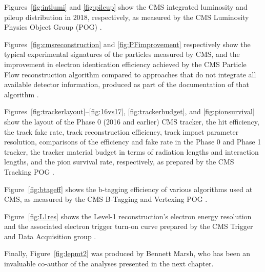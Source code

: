 Figures~\ref{fig:intlumi} and \ref{fig:pileup} show the CMS integrated luminosity and pileup distribution in 2018, respectively, as measured by the CMS Luminosity Physics Object Group (POG) \cite{lumipublic}.

Figures~\ref{fig:cmsreconstruction} and \ref{fig:PFimprovement} respectively show the typical experimental signatures of the particles measured by CMS, and the improvement in electron identication efficiency achieved by the CMS Particle Flow reconstruction algorithm compared to approaches that do not integrate all available detector information, produced as part of the documentation of that algorithm \cite{particleflow}.

Figures~\ref{fig:trackerlayout}--\ref{fig:16vs17}, \ref{fig:trackerbudget}, and \ref{fig:pionsurvival} show the layout of the Phase 0 (2016 and earlier) CMS tracker, the hit efficiency, the track fake rate, track reconstruction efficiency, track impact parameter resolution, comparisons of the efficiency and fake rate in the Phase 0 and Phase 1 tracker, the tracker material budget in terms of radiation lengths and interaction lengths, and the pion survival rate, respectively, as prepared by the CMS Tracking POG \cite{cmstracking}.

Figure~\ref{fig:btageff} shows the b-tagging efficiency of various algorithms used at CMS, as measured by the CMS B-Tagging and Vertexing POG \cite{btagging}.

Figure~\ref{fig:L1res} shows the Level-1 reconstruction's electron energy resolution and the associated electron trigger turn-on curve prepared by the CMS Trigger and Data Acquisition group \cite{trigger}.

Finally, Figure~\ref{fig:lepmt2} was produced by Bennett Marsh, who has been an invaluable co-author of the analyses presented in the next chapter.
